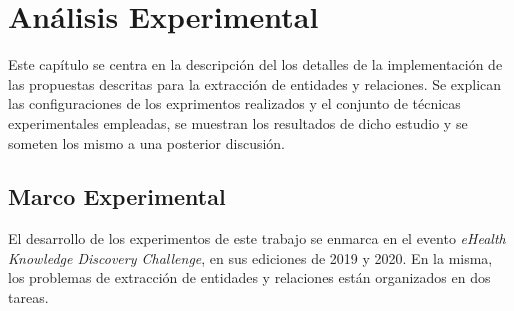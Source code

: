 \chapter{Análisis Experimental}\label{chapter:experiments}

Este capítulo se centra en la descripción del los detalles de la implementación de las propuestas descritas para la extracción de entidades y relaciones.
Se explican las configuraciones de los exprimentos realizados y el conjunto de técnicas experimentales empleadas, se muestran los resultados de dicho estudio y se someten los mismo a una posterior discusión.

\section{Marco Experimental}

El desarrollo de los experimentos de este trabajo se enmarca en el evento \textit{eHealth Knowledge Discovery Challenge}, en sus ediciones de 2019 y 2020.
En la misma, los problemas de extracción de entidades y relaciones están organizados en dos tareas.

